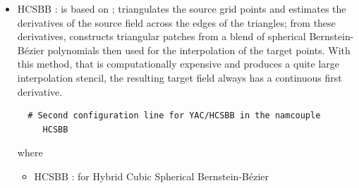 \begin{itemize}
\begin{verbatim}
  # Second configuration line for YAC/NCC in the namcouple
     NCC $weighting
\end{verbatim}
where
\begin{itemize}
\item NCC : for nearest cell corner 
\item {\tt \$weighting} {\tt [string]} : how to weight the values of the vertices connected to the source nearest cell corner ; can be :
   \begin{itemize}
   \item {\tt AVG} : arithmetic average ;
   \item {\tt DIST} : inverse distance weighting.
   \end{itemize} 
\end{itemize} 

\item HCSBB : is based on \cite{alfeld}; triangulates the source grid points and estimates the derivatives of the source field
across the edges of the triangles; from these derivatives, constructs triangular patches from a blend of
spherical Bernstein-B\'ezier polynomials then used for the interpolation of the
target points. With this method, that is computationally expensive and produces a quite large interpolation stencil, the resulting target field always has a continuous first derivative.

\begin{verbatim}
  # Second configuration line for YAC/HCSBB in the namcouple
     HCSBB 
\end{verbatim}
where
\begin{itemize}
\item HCSBB : for Hybrid Cubic Spherical Bernstein-B\'ezier
\end{itemize}


\end{itemize}
